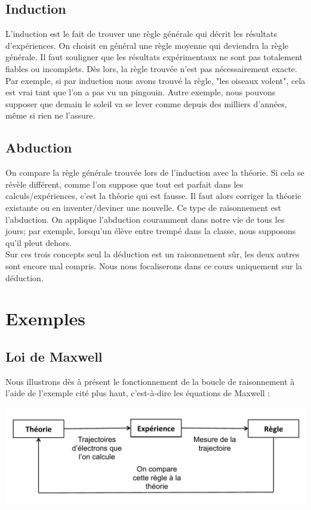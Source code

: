 \subsection{Induction}

L'induction est le fait de trouver une règle générale qui décrit les résultats d'expériences. On choisit en général une règle moyenne qui deviendra la règle générale.  Il faut souligner que les résultats expérimentaux ne sont pas totalement fiables ou incomplets. Dès lors, la règle trouvée n'est pas nécessairement exacte.  Par exemple, si par induction nous avons trouvé la règle, "les oiseaux volent", cela est vrai tant que l'on a pas vu un pingouin. Autre exemple, nous pouvons supposer que demain le soleil va se lever comme depuis des milliers d'années, même si rien ne l'assure.\\

\subsection{Abduction}

On compare la règle générale trouvée lors de l'induction avec la théorie. Si cela se révèle différent, comme l'on suppose que tout est parfait dans les calculs/expériences, c'est la théorie qui est fausse. Il faut alors corriger la théorie existante ou en inventer/deviner une nouvelle. Ce type de raisonnement est l'abduction. On applique l'abduction couramment dans notre vie de tous les jours; par exemple, lorsqu'un élève entre trempé dans la classe, nous supposons qu'il pleut dehors. \\


Sur ces trois concepts seul la déduction est un raisonnement sûr, les deux autres sont encore mal compris. Nous nous focaliserons dans ce cours uniquement sur la déduction. \\


\section{Exemples}

\subsection{Loi de Maxwell}

Nous illustrons dès à présent le fonctionnement de la boucle de raisonnement à l'aide de l'exemple cité plus haut, c'est-à-dire les équations de Maxwell :

\begin{center}
\includegraphics[scale=0.50]{images/BoucleRaisonnement2.pdf}
\end{center}

